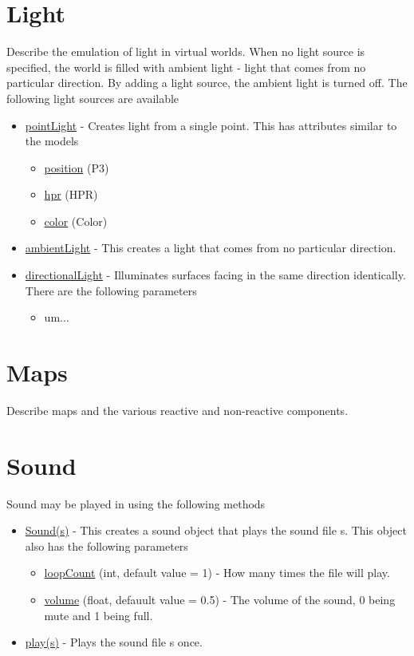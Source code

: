 \documentclass[10pt]{article}
\begin{document}
\section*{Light}
Describe the emulation of light in virtual worlds.
When no light source is specified, the world is filled with ambient light - light that comes from no particular direction.
By adding a light source, the ambient light is turned off.
The following light sources are available
\begin{itemize}
    \item \underline{pointLight} - Creates light from a single point.
    This has attributes similar to the models
    \begin{itemize}
        \item \underline{position} (P3)
        \item \underline{hpr} (HPR)
        \item \underline{color} (Color)
    \end{itemize}
    \item \underline{ambientLight} - This creates a light that comes from no particular direction.
    \item \underline{directionalLight} - Illuminates surfaces facing in the same direction identically.
    There are the following parameters
    \begin{itemize}
        \item um...
    \end{itemize}
\end{itemize}



\section*{Maps}
Describe maps and the various reactive and non-reactive components.



\section*{Sound}
Sound may be played in using the following methods
\begin{itemize}
    \item \underline{Sound(s)} - This creates a sound object that plays the sound file s.
    This object also has the following parameters
    \begin{itemize}
        \item \underline{loopCount} (int, default value = 1) - How many times the file will play.
        \item \underline{volume} (float, defauult value = 0.5) - The volume of the sound, 0 being mute and 1 being full.
    \end{itemize}
    \item \underline{play(s)} - Plays the sound file s once.
\end{itemize}
\end{document}
